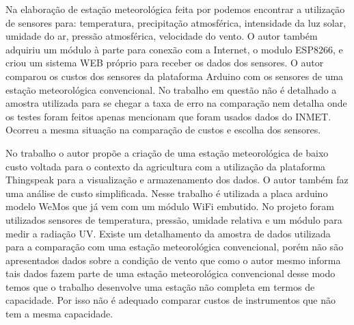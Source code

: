 Na elaboração de estação meteorológica feita por \cite{da2016estaccao} podemos encontrar a utilização de sensores para: temperatura, precipitação atmosférica, intensidade da luz solar, umidade do ar, pressão atmosférica, velocidade do vento. O autor também adquiriu um módulo à parte para conexão com a Internet, o modulo ESP8266, e criou um sistema WEB próprio para receber os dados dos sensores. O autor comparou os custos dos sensores da plataforma Arduino com os sensores de uma estação meteorológica convencional. No trabalho em questão não é detalhado a amostra utilizada para se chegar a taxa de erro na comparação nem detalha onde os testes foram feitos apenas mencionam que foram usados dados do INMET. Ocorreu a mesma situação na comparação de custos e escolha dos sensores.

No trabalho \cite{deestaccao} o autor propõe a criação de uma estação meteorológica de baixo custo voltada para o contexto da agricultura com a utilização da plataforma Thingspeak para a visualização e armazenamento dos dados. O autor também faz uma análise de custo simplificada. Nesse trabalho é utilizada a placa arduino modelo WeMos que já vem com um módulo WiFi embutido. No projeto foram utilizados sensores de temperatura, pressão, umidade relativa e um módulo para medir a radiação UV. Existe um detalhamento da amostra de dados utilizada para a comparação com uma estação meteorológica convencional, porém não são apresentados dados sobre a condição de vento que como o autor mesmo informa tais dados fazem parte de uma estação meteorológica convencional desse modo temos que o trabalho desenvolve uma estação não completa em termos de capacidade. Por isso não é adequado comparar custos de instrumentos que não tem a mesma capacidade.  

